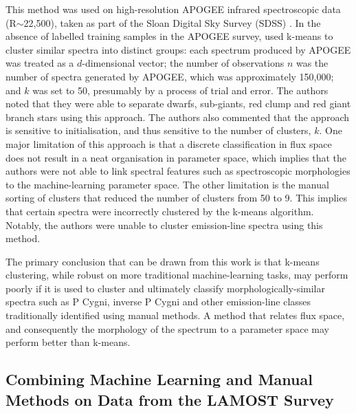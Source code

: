 This method was used on high-resolution APOGEE infrared spectroscopic data (R$\sim$22,500), taken as part of the Sloan Digital Sky Survey (SDSS) \citep{eisenstein2001spectroscopic, blanton2017sloan}. In the absence of labelled training samples in the APOGEE survey, \citet{garcia2018machine} used k-means to cluster similar spectra into distinct groups: each spectrum produced by APOGEE was treated as a $d$-dimensional vector; the number of observations $n$ was the number of spectra generated by APOGEE, which was approximately 150,000; and $k$ was set to 50, presumably by a process of trial and error. The authors noted that they were able to separate dwarfs, sub-giants, red clump and red giant branch stars using this approach. The authors also commented that the approach is sensitive to initialisation, and thus sensitive to the number of clusters, $k$. One major limitation of this approach is that a discrete classification in flux space does not result in a neat organisation in parameter space, which implies that the authors were not able to link spectral features such as spectroscopic morphologies to the machine-learning parameter space. The other limitation is the manual sorting of clusters that reduced the number of clusters from 50 to 9. This implies that certain spectra were incorrectly clustered by the k-means algorithm. Notably, the authors were unable to cluster emission-line spectra using this method. 

The primary conclusion that can be drawn from this work is that k-means clustering, while robust on more traditional machine-learning tasks, may perform poorly if it is used to cluster and ultimately classify morphologically-similar spectra such as P Cygni, inverse P Cygni and other emission-line classes traditionally identified using manual methods. A method that relates flux space, and consequently the morphology of the spectrum to a parameter space may perform better than k-means. 

\subsection{Combining Machine Learning and Manual Methods on Data from the LAMOST Survey}


